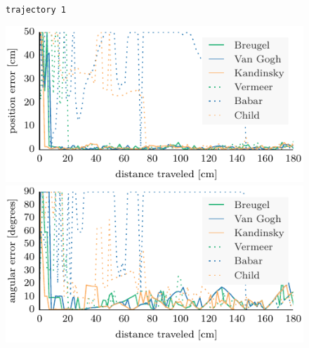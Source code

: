 \documentclass[letterpaper, 10pt, conference]{ieeeconf}
\begin{document}
\begin{figure}
\begin{center}
\texttt{trajectory~1}
\end{center}
\vspace{-.3em}
\includegraphics{ml-grayscale_images-random_1-xy}\hfill
\includegraphics{ml-grayscale_images-random_1-theta}



\end{figure}
\end{document}
